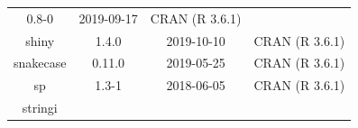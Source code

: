 \documentclass[11pt,]{book}
\begin{document}
\begin{longtable}[]{@{}cccc@{}}
\begin{minipage}[t]{0.19\columnwidth}
0.8-0\strut
\end{minipage} & \begin{minipage}[t]{0.16\columnwidth}\centering\strut
2019-09-17\strut
\end{minipage} & \begin{minipage}[t]{0.36\columnwidth}\centering\strut
CRAN (R 3.6.1)\strut
\end{minipage}\tabularnewline
\begin{minipage}[t]{0.18\columnwidth}\centering\strut
shiny\strut
\end{minipage} & \begin{minipage}[t]{0.19\columnwidth}\centering\strut
1.4.0\strut
\end{minipage} & \begin{minipage}[t]{0.16\columnwidth}\centering\strut
2019-10-10\strut
\end{minipage} & \begin{minipage}[t]{0.36\columnwidth}\centering\strut
CRAN (R 3.6.1)\strut
\end{minipage}\tabularnewline
\begin{minipage}[t]{0.18\columnwidth}\centering\strut
snakecase\strut
\end{minipage} & \begin{minipage}[t]{0.19\columnwidth}\centering\strut
0.11.0\strut
\end{minipage} & \begin{minipage}[t]{0.16\columnwidth}\centering\strut
2019-05-25\strut
\end{minipage} & \begin{minipage}[t]{0.36\columnwidth}\centering\strut
CRAN (R 3.6.1)\strut
\end{minipage}\tabularnewline
\begin{minipage}[t]{0.18\columnwidth}\centering\strut
sp\strut
\end{minipage} & \begin{minipage}[t]{0.19\columnwidth}\centering\strut
1.3-1\strut
\end{minipage} & \begin{minipage}[t]{0.16\columnwidth}\centering\strut
2018-06-05\strut
\end{minipage} & \begin{minipage}[t]{0.36\columnwidth}\centering\strut
CRAN (R 3.6.1)\strut
\end{minipage}\tabularnewline
\begin{minipage}[t]{0.18\columnwidth}\centering\strut
stringi\strut
\end{minipage} & \begin{minipage}[t]{0.19\columnwidth}\centering\strut

\end{minipage}
\end{longtable}
\end{document}
